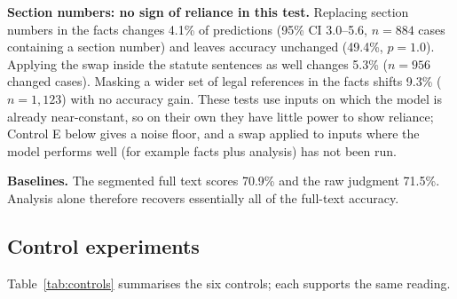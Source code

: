 \documentclass[conference]{IEEEtran}
\begin{document}
\textbf{Section numbers: no sign of reliance in this test.} Replacing section numbers in the facts changes 4.1\% of predictions (95\% CI 3.0--5.6, $n=884$ cases containing a section number) and leaves accuracy unchanged (49.4\%, $p=1.0$). Applying the swap inside the statute sentences as well changes 5.3\% ($n=956$ changed cases). Masking a wider set of legal references in the facts shifts 9.3\% ($n=1{,}123$) with no accuracy gain. These tests use inputs on which the model is already near-constant, so on their own they have little power to show reliance; Control E below gives a noise floor, and a swap applied to inputs where the model performs well (for example facts plus analysis) has not been run.

\textbf{Baselines.} The segmented full text scores 70.9\% and the raw judgment 71.5\%. Analysis alone therefore recovers essentially all of the full-text accuracy.

\subsection{Control experiments}
Table~\ref{tab:controls} summarises the six controls; each supports the same reading.
\end{document}
